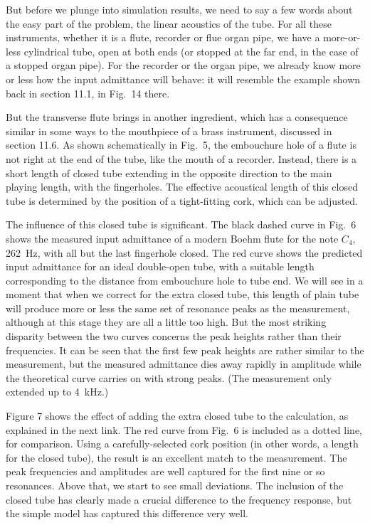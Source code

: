 
  But before we plunge into simulation results, we need to say a few words 
  about the easy part of the problem, the linear acoustics of the tube. For all 
  these instruments, whether it is a flute, recorder or flue organ pipe, we 
  have a more-or-less cylindrical tube, open at both ends (or stopped at the 
  far end, in the case of a stopped organ pipe). For the recorder or the organ 
  pipe, we already know more or less how the input admittance will behave: it 
  will resemble the example shown back in section 11.1, in Fig.\ 14 there. 

  But the transverse flute brings in another ingredient, which has a 
  consequence similar in some ways to the mouthpiece of a brass instrument, 
  discussed in section 11.6. As shown schematically in Fig.\ 5, the embouchure 
  hole of a flute is not right at the end of the tube, like the mouth of a 
  recorder. Instead, there is a short length of closed tube extending in the 
  opposite direction to the main playing length, with the fingerholes. The 
  effective acoustical length of this closed tube is determined by the position 
  of a tight-fitting cork, which can be adjusted. 

  The influence of this closed tube is significant. The black dashed curve in 
  Fig.\ 6 shows the measured input admittance of a modern Boehm flute for the 
  note $C_4$, 262~Hz, with all but the last fingerhole closed. The red curve 
  shows the predicted input admittance for an ideal double-open tube, with a 
  suitable length corresponding to the distance from embouchure hole to tube 
  end. We will see in a moment that when we correct for the extra closed tube, 
  this length of plain tube will produce more or less the same set of resonance 
  peaks as the measurement, although at this stage they are all a little too 
  high. But the most striking disparity between the two curves concerns the 
  peak heights rather than their frequencies. It can be seen that the first few 
  peak heights are rather similar to the measurement, but the measured 
  admittance dies away rapidly in amplitude while the theoretical curve carries 
  on with strong peaks. (The measurement only extended up to 4~kHz.) 

  Figure 7 shows the effect of adding the extra closed tube to the calculation, 
  as explained in the next link. The red curve from Fig.\ 6 is included as a 
  dotted line, for comparison. Using a carefully-selected cork position (in 
  other words, a length for the closed tube), the result is an excellent match 
  to the measurement. The peak frequencies and amplitudes are well captured for 
  the first nine or so resonances. Above that, we start to see small 
  deviations. The inclusion of the closed tube has clearly made a crucial 
  difference to the frequency response, but the simple model has captured this 
  difference very well. 

